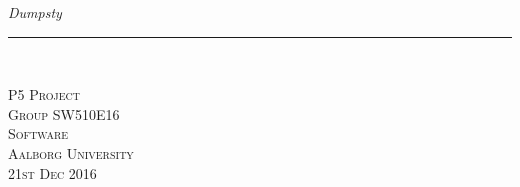 	\thispagestyle{empty}
\begin{flushright}
\vspace{3cm}

\phantom{hul}

\phantom{hul}

\phantom{hul}

\textsl{\Huge Dumpsty} \\ \vspace{1cm}

\rule{13cm}{3mm} \\ \vspace{1.5cm}
\vspace{1cm}



\vspace{7cm} 
\textsc{\Large P5 Project \\
Group SW510E16 \\
Software\\
Aalborg University\\
21st Dec 2016\\}
\end{flushright}
